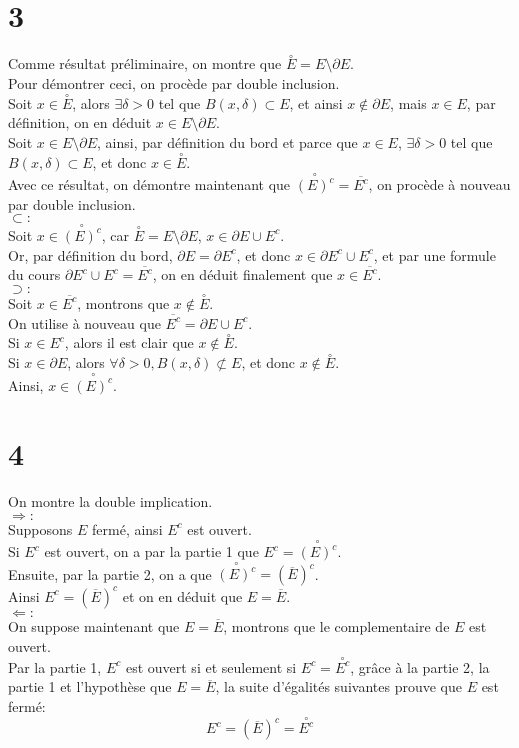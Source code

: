 \documentclass[11pt, a4paper]{article}
\newcommand{\del}{\partial}
\begin{document}
\section*{3}
Comme résultat préliminaire, on montre que $ \overset{\circ}{ E } = E \setminus \del E$.\\
Pour démontrer ceci, on procède par double inclusion.\\
Soit $x \in \overset{\circ}{ E } $, alors $\exists \delta>0$ tel que $B( x,\delta)\subset E$, et ainsi $x \notin \del E$, mais $x \in E$, par définition, on en déduit $x \in E \setminus \del E$.\\
Soit  $x \in E \setminus \del E$, ainsi, par définition du bord et parce que $x \in E$, $\exists \delta>0$ tel que $B( x,\delta) \subset E $, et donc $x \in \overset{\circ}{ E }$.\\
Avec ce résultat, on démontre maintenant que $\overset{\circ}{ ( E )^{c} } = \overline{E^{c}}	$, on procède à nouveau par double inclusion.\\
$\subset:$\\
Soit $x \in\overset{\circ}{ ( E )^{c} }$, car $ \overset{\circ}{ E } = E \setminus \del E$, $x \in \del E \cup E^{c}$.\\
Or, par définition du bord, $\del E = \del E^{c} $, et donc $x \in \del E^{c}\cup E^{c}$, et par une formule du cours $\del E^{c}\cup E^{c} = \overline{E^{c}}$, on en déduit finalement que $x\in \overline{E^{c}}$.\\
$\supset:$\\
Soit $x \in \overline{E^{c}}$, montrons que $x \notin \overset{\circ}{ E }$.\\
On utilise à nouveau que $\overline{E^{c}} = \del E \cup E^{c}$.\\
Si $x \in E^{c}$, alors il est clair que $x \notin\overset{\circ}{ E }$.\\
Si $x \in \del E$, alors $\forall \delta>0, B( x,\delta) \not\subset E$, et donc $x \notin \overset{\circ}{ E }$.\\
Ainsi, $x \in \overset{\circ}{ ( E )^{c} }$.
\section*{4}
On montre la double implication.\\
$ \Rightarrow :$\\
Supposons $E$ fermé, ainsi $E^{c}$ est ouvert.\\
Si $E^{c}$ est ouvert, on a par la partie 1 que $E^{c}= \overset{\circ}{ ( E )^{c} }$.\\
Ensuite, par la partie 2, on a que $\overset{\circ}{ ( E )^{c} } = ( \overline{E})^{c}$.\\
Ainsi $E^{c}= ( \overline{E})^{c}$ et on en déduit que $E = \overline{E}$.\\
$\Leftarrow :$\\
On suppose maintenant que $E = \overline{E}$, montrons que le complementaire de $E$ est ouvert.\\
Par la partie 1,  $E^{c}$ est ouvert si et seulement si $E^{c}= \overset{\circ}{ E ^{c} }$, grâce à la partie 2, la partie 1 et l'hypothèse que $E = \overline{E}$, la suite d'égalités suivantes prouve que $E$ est fermé:
\[ 
	E^{c}= ( \overline{E}) ^{c} = \overset{\circ}{ E ^{c} }
\]
\end{document}
